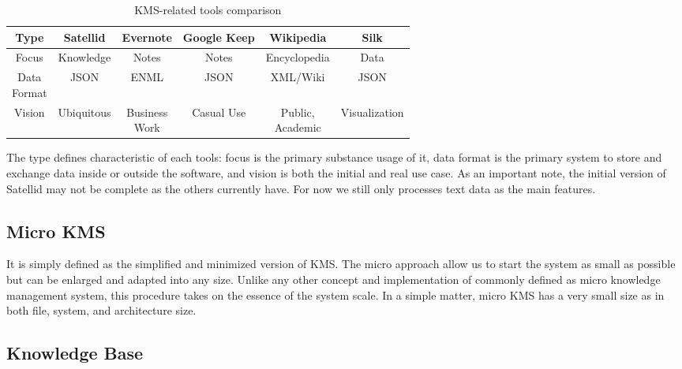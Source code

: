 \begin{table}[h!]
\centering
\begin{tabular}{ |c||c|c|c|c|c| }
\hline
Type         & Satellid   & Evernote      & Google Keep & Wikipedia    & Silk \\ \hline
\hline
Focus        & Knowledge  & Notes         & Notes       & Encyclopedia & Data \\ \hline
\shortstack{Data\\Format} & JSON       & ENML          & JSON        & XML/Wiki     & JSON \\ \hline
Vision       & Ubiquitous & \shortstack{Business\\Work} & Casual Use  & \shortstack{Public,\\Academic} & Visualization \\
\hline
\end{tabular}
\caption{KMS-related tools comparison}
\label{table:kms-comparison}
\end{table}

The type defines characteristic of each tools: focus is the primary substance usage of it, data format is the primary system to store and exchange data inside or outside the software, and vision is both the initial and real use case.
As an important note, the initial version of Satellid may not be complete as the others currently have.
For now we still only processes text data as the main features.

\subsection{Micro {KMS}}

It is simply defined as the simplified and minimized version of \ac{KMS}.
The micro approach allow us to start the system as small as possible but can be enlarged and adapted into any size.
Unlike any other concept and implementation of commonly defined as micro knowledge management system, this procedure takes on the essence of the system scale.
In a simple matter, micro \ac{KMS} has a very small size as in both file, system, and architecture size.

\subsection{Knowledge Base}

